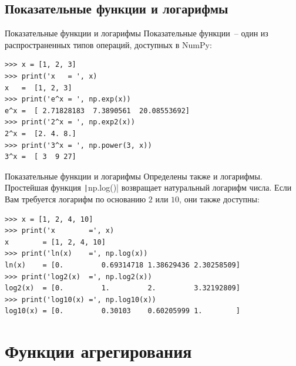 \documentclass[aspectratio=169, mathserif]{beamer}%
\begin{document}
\subsection{Показательные функции и логарифмы}
\begin{frame}[fragile]{Показательные функции и логарифмы}
\scriptsize
Показательные функции~-- один из  распространенных типов операций, доступных в NumPy:

\begin{verbatim}
>>> x = [1, 2, 3]
>>> print('x   = ', x)
x   =  [1, 2, 3]
>>> print('e^x = ', np.exp(x))
e^x =  [ 2.71828183  7.3890561  20.08553692]
>>> print('2^x = ', np.exp2(x))
2^x =  [2. 4. 8.]
>>> print('3^x = ', np.power(3, x))
3^x =  [ 3  9 27]
\end{verbatim}
\vfill
\end{frame}

\begin{frame}[fragile]{Показательные функции и логарифмы}
\scriptsize
Определены также и логарифмы. Простейшая функция \texttt|np.log()| возвращает натуральный логарифм числа. Если Вам требуется логарифм по основанию $2$ или $10$, они также доступны:

\begin{verbatim}
>>> x = [1, 2, 4, 10]
>>> print('x        =', x)
x        = [1, 2, 4, 10]
>>> print('ln(x)    =', np.log(x))
ln(x)    = [0.         0.69314718 1.38629436 2.30258509]
>>> print('log2(x)  =', np.log2(x))
log2(x)  = [0.         1.         2.         3.32192809]
>>> print('log10(x) =', np.log10(x))
log10(x) = [0.         0.30103    0.60205999 1.        ]
\end{verbatim}
\vfill
\end{frame}


\section{Функции агрегирования}
\sectionframe
\end{document}
